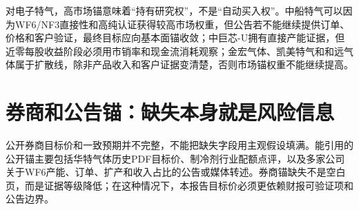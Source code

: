 对电子特气，高市场锚意味着“持有研究权”，不是“自动买入权”。中船特气可以因为WF6/NF3直接性和高纯认证获得较高市场权重，但公告若不能继续提供订单、价格和客户验证，最终目标应向基本面锚收敛；中巨芯-U拥有直接产能证据，但近零每股收益阶段必须用市销率和现金流消耗观察；金宏气体、凯美特气和和远气体属于扩散线，除非产品收入和客户证据变清楚，否则市场锚权重不能继续提高。

\section{券商和公告锚：缺失本身就是风险信息}
公开券商目标价和一致预期并不完整，不能把缺失字段用主观假设填满。能引用的公开锚主要包括华特气体历史PDF目标价、制冷剂行业配额点评，以及多家公司关于WF6产能、订单、扩产和收入占比的公告或媒体转述。券商锚缺失不是空白页，而是证据等级降低；在这种情况下，本报告目标价必须更依赖财报可验证项和公告边界。


